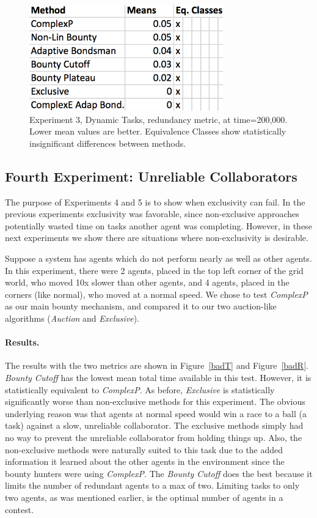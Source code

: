 \documentclass[letterpaper]{aamas2015}
\newcommand\paragrapha[1]{\paragraph*{{#1}.}}
\begin{document}
\begin{figure}[t]
\begin{center}\includegraphics[width=3.3in]{rotR.png}\end{center}
\vspace{-0.5em}\caption{Experiment 3, Dynamic Tasks, redundancy metric, at time=200,000.  Lower mean values are better.  Equivalence Classes show statistically insignificant differences between methods.}
\label{rotR}
\end{figure}



\subsection{Fourth Experiment: Unreliable Collaborators}
The purpose of Experiments 4 and 5 is to show when exclusivity can fail. In the previous experiments exclusivity was favorable, since non-exclusive approaches potentially wasted time on tasks another agent was completing. However, in these next experiments we show there are situations where non-exclusivity is desirable.

Suppose a system has agents which do not perform nearly as well as other agents. In this experiment, there were 2 agents, placed in the top left corner of the grid world, who moved 10x slower than other agents, and 4 agents, placed in the corners (like normal), who moved at a normal speed. We chose to test \textit{ComplexP} as our main bounty mechanism, and compared it to our two auction-like algorithms (\textit{Auction} and \textit{Exclusive}).

\paragrapha{Results} 
The results with the two metrics are shown in Figure~\ref{badT} and Figure~\ref{badR}.  \textit{Bounty Cutoff} has the lowest mean total time available in this test.  However, it is statistically equivalent to \textit{ComplexP}.  As before, \textit{Exclusive} is statistically significantly worse than non-exclusive methods for this experiment. The obvious underlying reason was that agents at normal speed would win a race to a ball (a task) against a slow, unreliable collaborator.  The exclusive methods simply had no way to prevent the unreliable collaborator from holding things up.  Also, the non-exclusive methods were naturally suited to this task due to the added information it learned about the other agents in the environment since the bounty hunters were using \textit{ComplexP}.  The \textit{Bounty Cutoff} does the best because it limits the number of redundant agents to a max of two.  Limiting tasks to only two agents, as was mentioned earlier, is the optimal number of agents in a contest.
\end{document}
